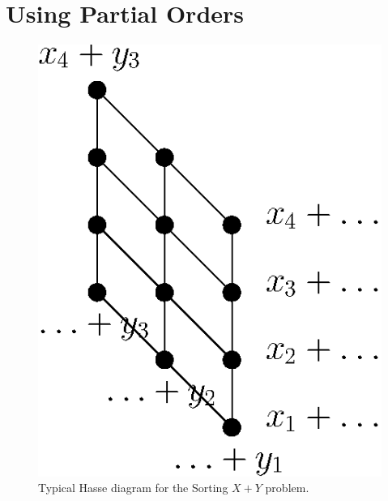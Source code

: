 \section{Using Partial Orders}

\begin{figure}
	\centering
	\includegraphics[height=0.2\textheight]{fig/open/x+y}
	\caption{Typical Hasse diagram for the Sorting $X + Y$ problem.}
	\label{fig:xy:poset:chains}
\end{figure}

